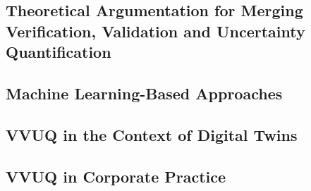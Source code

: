 \subsection{Theoretical Argumentation for Merging Verification, Validation and Uncertainty Quantification}
\label{sec:merging-vvuq}

\subsection{Machine Learning-Based Approaches}
\label{sec:ml-approaches}

\subsection{VVUQ in the Context of Digital Twins}
\label{sec:vvuq-dt}

\subsection{VVUQ in Corporate Practice}
\label{sec:vvuq-corporate-practice}



